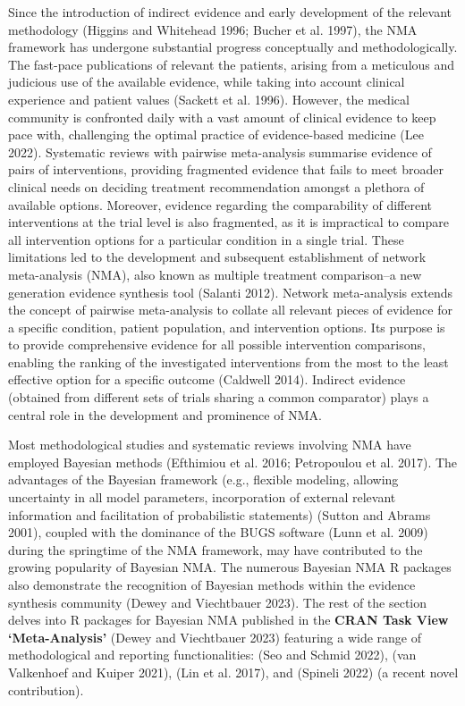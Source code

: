 Since the introduction of indirect evidence and early development of the relevant
methodology (Higgins and Whitehead 1996; Bucher et al. 1997), the NMA framework has undergone substantial
progress conceptually and methodologically. The fast-pace publications of relevant
the patients, arising from a meticulous and judicious use of the available evidence,
while taking into account clinical experience and patient values (Sackett et al. 1996).
However, the medical community is confronted daily with a vast amount of clinical
evidence to keep pace with, challenging the optimal practice of evidence-based
medicine (Lee 2022). Systematic reviews with pairwise meta-analysis summarise evidence
of pairs of interventions, providing fragmented evidence that fails to meet broader
clinical needs on deciding treatment recommendation amongst a plethora of available
options. Moreover, evidence regarding the comparability of different interventions
at the trial level is also fragmented, as it is impractical to compare all intervention
options for a particular condition in a single trial. These limitations led to the
development and subsequent establishment of network meta-analysis (NMA), also known
as multiple treatment comparison--a new generation evidence synthesis tool (Salanti 2012).
Network meta-analysis extends the concept of pairwise meta-analysis to collate all
relevant pieces of evidence for a specific condition, patient population, and
intervention options. Its purpose is to provide comprehensive evidence for all possible
intervention comparisons, enabling the ranking of the investigated interventions
from the most to the least effective option for a specific outcome (Caldwell 2014).
Indirect evidence (obtained from different sets of trials sharing a common comparator)
plays a central role in the development and prominence of NMA.

Most methodological studies and systematic reviews involving NMA have employed
Bayesian methods (Efthimiou et al. 2016; Petropoulou et al. 2017). The advantages of the Bayesian
framework (e.g., flexible modeling, allowing uncertainty in all model parameters,
incorporation of external relevant information and facilitation of probabilistic
statements) (Sutton and Abrams 2001), coupled with the dominance of the BUGS software
(Lunn et al. 2009) during the springtime of the NMA framework, may have contributed to
the growing popularity of Bayesian NMA. The numerous Bayesian NMA R packages
also demonstrate the recognition of Bayesian methods within the evidence synthesis
community (Dewey and Viechtbauer 2023). The rest of the section delves into R packages for
Bayesian NMA published in the \textbf{CRAN Task View `Meta-Analysis'} (Dewey and Viechtbauer 2023)
featuring a wide range of methodological and reporting functionalities:  (Seo and Schmid 2022),
 (van Valkenhoef and Kuiper 2021),  (Lin et al. 2017), and 
(Spineli 2022) (a recent novel contribution).

